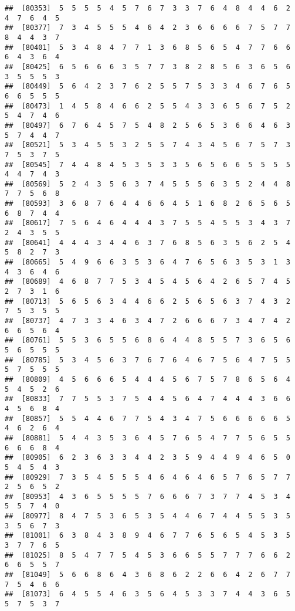 \documentclass[
]{book}
\begin{document}
\begin{verbatim}
##  [80353]  5  5  5  5  4  5  7  6  7  3  3  7  6  4  8  4  4  6  2  4  7  6  4  5
##  [80377]  7  3  4  5  5  5  4  6  4  2  3  6  6  6  6  7  5  7  7  8  4  4  3  7
##  [80401]  5  3  4  8  4  7  7  1  3  6  8  5  6  5  4  7  7  6  6  6  4  3  6  4
##  [80425]  6  5  6  6  6  3  5  7  7  3  8  2  8  5  6  3  6  5  6  3  5  5  5  3
##  [80449]  5  6  4  2  3  7  6  2  5  5  7  5  3  3  4  6  7  6  5  6  6  5  5  5
##  [80473]  1  4  5  8  4  6  6  2  5  5  4  3  3  6  5  6  7  5  2  5  4  7  4  6
##  [80497]  6  7  6  4  5  7  5  4  8  2  5  6  5  3  6  6  4  6  3  5  7  4  4  7
##  [80521]  5  3  4  5  5  3  2  5  5  7  4  3  4  5  6  7  5  7  3  7  5  3  7  5
##  [80545]  7  4  4  8  4  5  3  5  3  3  5  6  5  6  6  5  5  5  5  4  4  7  4  3
##  [80569]  5  2  4  3  5  6  3  7  4  5  5  5  6  3  5  2  4  4  8  7  7  5  6  8
##  [80593]  3  6  8  7  6  4  4  6  6  4  5  1  6  8  2  6  5  6  5  6  8  7  4  4
##  [80617]  7  5  6  4  6  4  4  4  3  7  5  5  4  5  5  3  4  3  7  2  4  3  5  5
##  [80641]  4  4  4  3  4  4  6  3  7  6  8  5  6  3  5  6  2  5  4  5  8  2  7  3
##  [80665]  5  4  9  6  6  3  5  3  6  4  7  6  5  6  3  5  3  1  3  4  3  6  4  6
##  [80689]  4  6  8  7  7  5  3  4  5  4  5  6  4  2  6  5  7  4  5  2  7  3  1  6
##  [80713]  5  6  5  6  3  4  4  6  6  2  5  6  5  6  3  7  4  3  2  7  5  3  5  5
##  [80737]  4  7  3  3  4  6  3  4  7  2  6  6  6  7  3  4  7  4  2  6  6  5  6  4
##  [80761]  5  5  3  6  5  5  6  8  6  4  4  8  5  5  7  3  6  5  6  5  6  5  5  5
##  [80785]  5  3  4  5  6  3  7  6  7  6  4  6  7  5  6  4  7  5  5  5  7  5  5  5
##  [80809]  4  5  6  6  6  5  4  4  4  5  6  7  5  7  8  6  5  6  4  5  4  5  2  6
##  [80833]  7  7  5  5  3  7  5  4  4  5  6  4  7  4  4  4  3  6  6  4  5  6  8  4
##  [80857]  5  5  4  4  6  7  7  5  4  3  4  7  5  6  6  6  6  6  5  4  6  2  6  4
##  [80881]  5  4  4  3  5  3  6  4  5  7  6  5  4  7  7  5  6  5  5  6  6  6  8  4
##  [80905]  6  2  3  6  3  3  4  4  2  3  5  9  4  4  9  4  6  5  0  5  4  5  4  3
##  [80929]  7  3  5  4  5  5  5  4  6  4  6  4  6  5  7  6  5  7  7  2  5  6  5  2
##  [80953]  4  3  6  5  5  5  5  7  6  6  6  7  3  7  7  4  5  3  4  5  5  7  4  0
##  [80977]  8  4  7  5  3  6  5  3  5  4  4  6  7  4  4  5  5  3  5  3  5  6  7  3
##  [81001]  6  3  8  4  3  8  9  4  6  7  7  6  5  6  5  4  5  3  5  3  7  7  6  5
##  [81025]  8  5  4  7  7  5  4  5  3  6  6  5  5  7  7  7  6  6  2  6  6  5  5  7
##  [81049]  5  6  6  8  6  4  3  6  8  6  2  2  6  6  4  2  6  7  7  7  5  4  6  6
##  [81073]  6  4  5  5  4  6  3  5  6  4  5  3  3  7  4  4  3  6  5  5  7  5  3  7

\end{verbatim}
\end{document}
